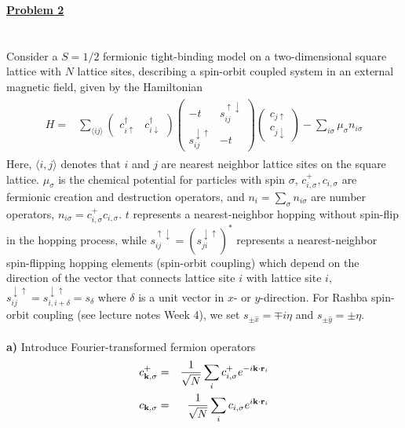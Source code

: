 \documentclass{article}
\begin{document}
\ \\
\ \\
\ \\
\underline{\large\bf Problem 2}\\
\ \\
\ \\
Consider a $S=1/2$ fermionic  tight-binding model on a two-dimensional square lattice with $N$ lattice sites, describing a spin-orbit coupled system in an external magnetic field, given by the Hamiltonian 
\begin{align}
\begin{split}
H =&   \sum_{\langle ij \rangle} 
\begin{pmatrix} c_{i\uparrow}^\dagger & c_{i\downarrow}^\dagger  \end{pmatrix}
\begin{pmatrix} -t & s_{ij}^{\uparrow\downarrow} \\ s_{ij}^{\downarrow\uparrow} & -t \end{pmatrix}  
\begin{pmatrix} c_{j\uparrow} \\ c_{j\downarrow}  \end{pmatrix}
- \sum_{i \sigma} \mu_\sigma n_{i\sigma} \nonumber 
\end{split}
\end{align}
Here,  $\langle i,j \rangle$ denotes that $i$ and $j$ are nearest neighbor lattice sites on the square lattice. $\mu_{\sigma}$ is the chemical potential for particles with spin $\sigma$, $c^{+}_{i,\sigma}, c_{i,\sigma}$ are fermionic creation and destruction 
operators, and $n_i = \sum_{\sigma} n_{i \sigma}$ are number operators, $n_{i \sigma} = c^{+}_{i,\sigma} c_{i,\sigma}$. $t$ represents a nearest-neighbor hopping without spin-flip in the hopping process, 
while $ s_{ij}^{\uparrow\downarrow} = (s_{ji}^{\downarrow\uparrow} )^*$ represents a nearest-neighbor spin-flipping hopping elements (spin-orbit coupling) which depend on the direction of the vector that connects lattice site $i$ with lattice site $i$, 
$s_{ij}^{\downarrow\uparrow} =s_{i, i+\delta}^{\downarrow\uparrow} = s_{\delta} $ where $\delta$ is a unit vector in $x$- or $y$-direction.  For Rashba spin-orbit coupling (see lecture notes Week 4), we set $s_{\pm \hat{ x}} = \mp i \eta$ 
and $s_{\pm \hat{y}}= \pm \eta$. 
\ \\
\ \\
{\bf a)} Introduce Fourier-transformed fermion operators 
\begin{eqnarray}
c^{+}_{{\bf k},\sigma} & = & \frac{1}{\sqrt{N}} \sum_i c^{+}_{i,\sigma} e^{-i {\bf k} \cdot {\bf r}_i} \nonumber \\
c_{{\bf k},\sigma} & = & \frac{1}{\sqrt{N}} \sum_i c_{i,\sigma} e^{i {\bf k} \cdot {\bf r}_i} \nonumber
\end{eqnarray}
\end{document}
